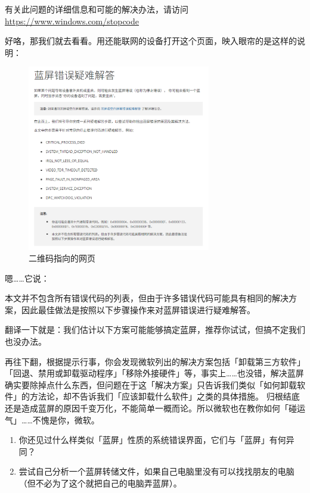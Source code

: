 \begin{note}
  有关此问题的详细信息和可能的解决办法，请访问 \url{https://www.windows.com/stopcode}
\end{note}

好咯，那我们就去看看。用还能联网的设备打开这个页面，映入眼帘的是这样的说明：

\begin{figure}[htb!]
  \centering
  \includegraphics[width=8cm]{assets/Stopcode-Webpage.png}
  \caption{二维码指向的网页}
  \label{Stopcode-Webpage}
\end{figure}

嗯……它说：

\begin{note}
  本文并不包含所有错误代码的列表，但由于许多错误代码可能具有相同的解决方案，因此最佳做法是按照以下步骤操作来对蓝屏错误进行疑难解答。
\end{note}

翻译一下就是：我们估计以下方案可能能够搞定蓝屏，推荐你试试，但搞不定我们也没办法。

再往下翻，根据提示行事，你会发现微软列出的解决方案包括「卸载第三方软件」「回退、禁用或卸载驱动程序」「移除外接硬件」等，事实上……也没错，解决蓝屏确实要除掉点什么东西，但问题在于这「解决方案」只告诉我们类似「如何卸载软件」的方法论，却不告诉我们「应该卸载什么软件」之类的具体措施。
归根结底还是造成蓝屏的原因千变万化，不能简单一概而论。所以微软也在教你如何「碰运气」……不愧是你，微软。

\practice

\begin{enumerate}
  \item 你还见过什么样类似「蓝屏」性质的系统错误界面，它们与「蓝屏」有何异同？
  \item 尝试自己分析一个蓝屏转储文件，如果自己电脑里没有可以找找朋友的电脑（但不必为了这个就把自己的电脑弄蓝屏）。
\end{enumerate}